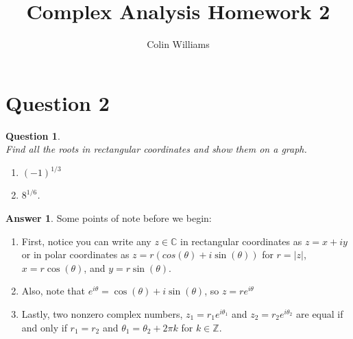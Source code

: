 \documentclass[10pt,a4paper]{article}
\title{Complex Analysis Homework 2}
\author{Colin Williams}
\newtheorem*{question*}{Question}
\theoremstyle{definition}
\newtheorem*{answer*}{Answer}
\begin{document}
\maketitle
\section*{Question 2}
\begin{question*}{$ $}
\\Find all the roots in rectangular coordinates and show them on a graph. 
\begin{enumerate}[label = \alph*.)]
\item $(-1)^{1/3}$
\item $8^{1/6}$.
\end{enumerate}
\end{question*}

\begin{answer*}
Some points of note before we begin:
\begin{enumerate}[label = \roman*.)]
\item First, notice you can write any $z \in \mathbb{C}$ in rectangular coordinates as $z = x + iy$ or in polar coordinates as $z = r(cos(\theta) + i\sin(\theta))$ for $r = |z|$, $x = r\cos(\theta)$, and $y = r\sin(\theta)$. 
\item Also, note that $e^{i\theta} = \cos(\theta) + i\sin(\theta)$, so $z = re^{i\theta}$
\item Lastly, two nonzero complex numbers, $z_1 = r_1e^{i\theta_1}$ and $z_2 = r_2e^{i\theta_2}$ are equal if and only if $r_1 = r_2$ and $\theta_1 = \theta_2 + 2\pi k$ for $k \in \mathbb{Z}$.
\end{enumerate}
\end{answer*}
\end{document}
